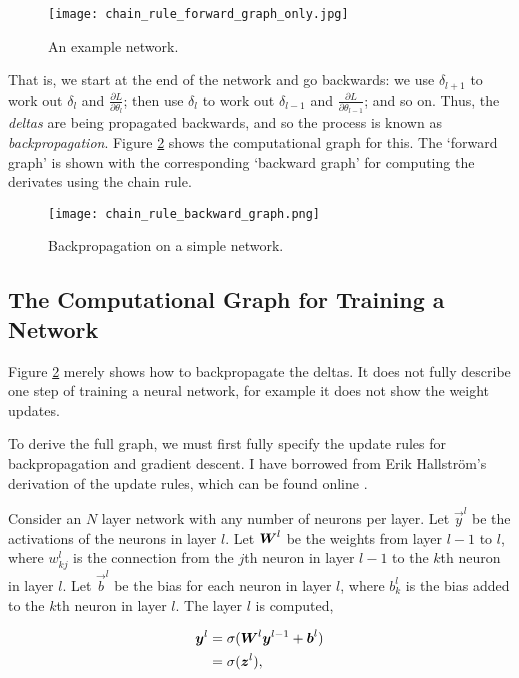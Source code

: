 \begin{figure}[t]
    \centering
    \texttt{[image: chain\_rule\_forward\_graph\_only.jpg]}
    \caption{An example network.}
    \label{fig:2-nn-chain-rule-forward}
\end{figure}

That is, we start at the end of the network and go backwards:
we use \(\delta_{l+1}\) to work out \(\delta_l\) and \(\frac{\partial L}{\partial \theta_l}\);
then use \(\delta_l\) to work out \(\delta_{l-1}\) and \(\frac{\partial L}{\partial \theta_{l-1}}\); and so on.
Thus, the \textit{deltas} are being propagated backwards, and so the process is known as \textit{backpropagation}.
Figure \ref{fig:2-nn-chain-rule-backward} shows the computational graph for this.
The `forward graph' is shown with the corresponding `backward graph' for computing the derivates using the chain rule.

\begin{figure}[htb]
    \centering
    \texttt{[image: chain\_rule\_backward\_graph.png]}
    \caption{Backpropagation on a simple network.}
    \label{fig:2-nn-chain-rule-backward}
\end{figure}


\subsection{The Computational Graph for Training a Network}
Figure \ref{fig:2-nn-chain-rule-backward} merely shows how to backpropagate the deltas.
It does not fully describe one step of training a neural network, for example it does not show the weight updates.

To derive the full graph, we must first fully specify the update rules for backpropagation and gradient descent.
I have borrowed from Erik Hallstr\"{o}m's derivation of the update rules, which can be found online \cite{Hallstrom-backprop}.

Consider an \(N\) layer network with any number of neurons per layer.
Let \(\vec{y}^l\) be the activations of the neurons in layer \(l\).
Let \({\boldsymbol{{W}}}^l\) be the weights from layer \(l-1\) to \(l\), where \(w^l_{kj}\) is the connection from the \(j\)th neuron in layer \(l-1\) to the \(k\)th neuron in layer \(l\).
Let \(\vec{b}^l\) be the bias for each neuron in layer \(l\), where \(b^l_k\) is the bias added to the \(k\)th neuron in layer \(l\). The layer \(l\) is computed,

\begin{align}
    {\boldsymbol{{y}}}^l &= \sigma({\boldsymbol{{W}}}^l {\boldsymbol{{y}}}^{l-1} + {\boldsymbol{{b}}}^l) \\
              &= \sigma({\boldsymbol{{z}}}^l),
\end{align}

